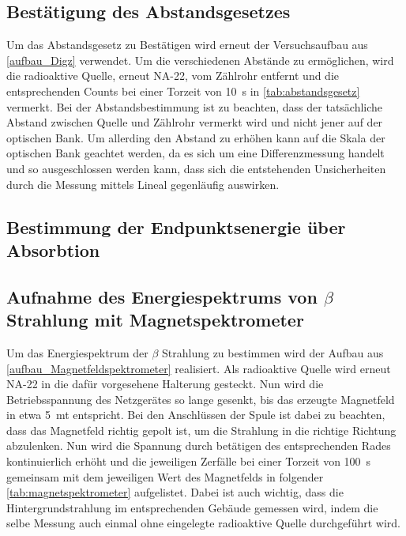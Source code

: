\documentclass[12pt,english,ngerman]{scrartcl}
\begin{document}


\subsection{Bestätigung des Abstandsgesetzes}

Um das Abstandsgesetz zu Bestätigen wird erneut der Versuchsaufbau aus \autoref{aufbau_Digz} verwendet. Um die verschiedenen 
Abstände zu ermöglichen, wird die radioaktive Quelle, erneut NA-22, vom Zählrohr entfernt und die entsprechenden Counts bei
einer Torzeit von \SI{10}{s} in \autoref{tab:abstandsgesetz} vermerkt. Bei der Abstandsbestimmung ist zu beachten,
dass der tatsächliche Abstand zwischen Quelle und Zählrohr vermerkt wird und nicht jener auf der optischen Bank. Um allerding
den Abstand zu erhöhen kann auf die Skala der optischen Bank geachtet werden, da es sich um eine Differenzmessung handelt 
und so ausgeschlossen werden kann, dass sich die entstehenden Unsicherheiten durch die Messung mittels Lineal gegenläufig auswirken.



\subsection{Bestimmung der Endpunktsenergie über Absorbtion}



\subsection{Aufnahme des Energiespektrums von $\beta$ Strahlung mit Magnetspektrometer}

Um das Energiespektrum der $\beta$ Strahlung zu bestimmen wird der Aufbau aus \autoref{aufbau_Magnetfeldspektrometer} realisiert.
Als radioaktive Quelle wird erneut NA-22 in die dafür vorgesehene Halterung gesteckt. Nun wird die Betriebsspannung des
Netzgerätes so lange gesenkt, bis das erzeugte Magnetfeld in etwa \SI{5}{mt} entspricht. Bei den Anschlüssen der Spule ist dabei zu beachten, dass das Magnetfeld richtig gepolt ist, um die Strahlung
in die richtige Richtung abzulenken. Nun wird die Spannung durch betätigen des entsprechenden Rades kontinuierlich erhöht
und die jeweiligen Zerfälle bei einer Torzeit von \SI{100}{s} gemeinsam mit dem jeweiligen Wert des Magnetfelds in folgender
\autoref{tab:magnetspektrometer} aufgelistet. Dabei ist auch wichtig, dass die Hintergrundstrahlung im entsprechenden Gebäude
gemessen wird, indem die selbe Messung auch einmal ohne eingelegte radioaktive Quelle durchgeführt wird.
\end{document}
